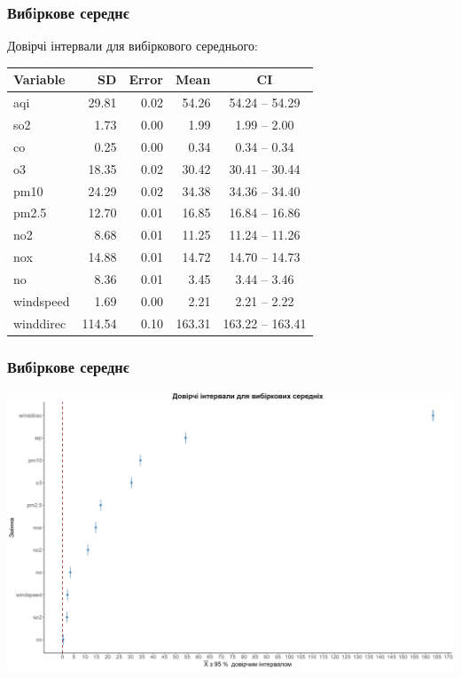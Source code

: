 \documentclass{beamer}
\begin{document}
\begin{frame}
  \frametitle{Вибiркове середнє}

  Довірчі інтервали для вибіркового середнього:

  \begin{table}[ht]
    \centering
    \begin{tabular}{lrrrc}
      \hline
      Variable  & SD     & Error & Mean  & CI               \\ 
      \hline
      aqi       & 29.81  & 0.02 & 54.26  & 54.24  -- 54.29  \\ 
      so2       & 1.73   & 0.00 & 1.99   & 1.99   -- 2.00   \\ 
      co        & 0.25   & 0.00 & 0.34   & 0.34   -- 0.34   \\ 
      o3        & 18.35  & 0.02 & 30.42  & 30.41  -- 30.44  \\ 
      pm10      & 24.29  & 0.02 & 34.38  & 34.36  -- 34.40  \\ 
      pm2.5     & 12.70  & 0.01 & 16.85  & 16.84  -- 16.86  \\ 
      no2       & 8.68   & 0.01 & 11.25  & 11.24  -- 11.26  \\ 
      nox       & 14.88  & 0.01 & 14.72  & 14.70  -- 14.73  \\ 
      no        & 8.36   & 0.01 & 3.45   & 3.44   -- 3.46   \\ 
      windspeed & 1.69   & 0.00 & 2.21   & 2.21   -- 2.22   \\ 
      winddirec & 114.54 & 0.10 & 163.31 & 163.22 -- 163.41 \\ 
      \hline
    \end{tabular}
  \end{table}
  
\end{frame}

\begin{frame}
  \frametitle{Вибiркове середнє}

  \begin{center}
    \includegraphics[width=\linewidth]{./plots/lab2/1-4-part/ci-means.png}
  \end{center}
  
\end{frame}
\end{document}
